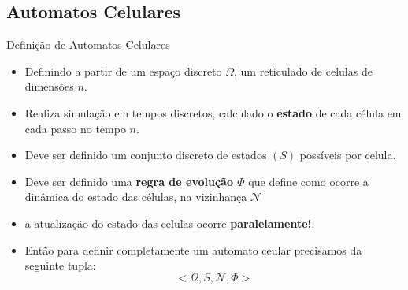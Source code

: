 \documentclass{beamer}
\begin{document}
		\subsection{Automatos Celulares}
		\begin{frame}{Definição de Automatos Celulares}
			\begin{itemize}[<+->]
				\item Definindo a partir de um espaço discreto $\Omega$, um reticulado  de celulas de dimensões $n$.
				\item Realiza simulação em tempos discretos, calculado o \textbf{estado} de cada célula em cada passo no tempo $n$.
				\item Deve ser definido um conjunto discreto de estados $(S)$ possíveis por celula.
				\item Deve ser definido uma \textbf{regra de evolução $\Phi$} que define como ocorre a dinâmica do estado das células, na vizinhança $\mathcal{N}$
				\item a atualização do estado das celulas ocorre \textbf{paralelamente!}.
				\item Então para definir completamente um automato ceular precisamos da seguinte tupla:
				\begin{equation}
					<\Omega, S, \mathcal{N}, \Phi>
				\end{equation}
			\end{itemize}
		\end{frame}
\end{document}

